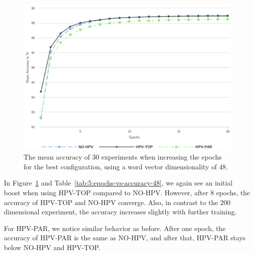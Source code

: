 \begin{figure}
	\centering
	\includegraphics[width=1.0\textwidth]{5experiments/epochs-vs-accuracy-48.png}
	\caption{The mean accuracy of 30 experiments when increasing the epochs for the best configuration, using a word vector dimensionality of 48.}
	\label{fig:5:epochs-vs-accuracy-48}
\end{figure}

In Figure~\ref{fig:5:epochs-vs-accuracy-48} and Table~\ref{tab:5:epochs-vs-accuracy-48}, we again see an initial boost when using HPV-TOP compared to NO-HPV\@. However, after 8 epochs, the accuracy of HPV-TOP and NO-HPV converge. Also, in contrast to the 200 dimensional experiment, the accuracy increases slightly with further training.

For HPV-PAR, we notice similar behavior as before. After one epoch, the accuracy of HPV-PAR is the same as NO-HPV, and after that, HPV-PAR stays below NO-HPV and HPV-TOP\@.

